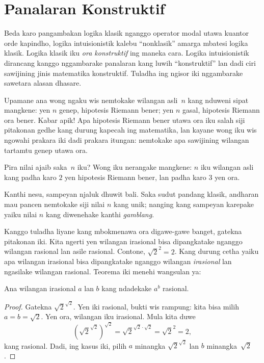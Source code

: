 \documentclass[../../../include/open-logic-chapter]{subfiles}
\begin{document}

\section{Panalaran Konstruktif}

Beda karo pangambakan logika klasik nganggo operator modal utawa
kuantor orde kapindho, logika intuisionistik kalebu ``nonklasik''
amarga mbatesi logika klasik. Logika klasik iku \emph{ora konstruktif}
ing maneka cara. Logika intuisionistik dirancang kanggo nggambarake
panalaran kang luwih ``konstruktif'' lan dadi ciri sawijining jinis
matematika konstruktif. Tuladha ing ngisor iki nggambarake sawetara
alasan dhasare.

Upamane ana wong ngaku wis nemtokake wilangan asli~$n$ kang nduweni
sipat mangkene: yen $n$ genep, hipotesis Riemann bener; yen $n$
gasal, hipotesis Riemann ora bener. Kabar apik!{} Apa hipotesis
Riemann bener utawa ora iku salah siji pitakonan gedhe kang durung
kapecah ing matematika, lan kayane wong iku wis ngowahi prakara iki
dadi prakara itungan: nemtokake apa sawijining wilangan tartamtu
genep utawa ora.

Pira nilai ajaib saka~$n$ iku? Wong iku nerangake mangkene: $n$ iku
wilangan asli kang padha karo $2$ yen hipotesis Riemann bener, lan
padha karo $3$ yen ora.

Kanthi nesu, sampeyan njaluk dhuwit bali. Saka sudut pandang klasik,
andharan mau pancen nemtokake siji nilai $n$ kang unik; nanging kang
sampeyan karepake yaiku nilai $n$ kang diwenehake kanthi
\emph{gamblang}.

Kanggo tuladha liyane kang mbokmenawa ora digawe-gawe banget,
gatekna pitakonan iki. Kita ngerti yen wilangan irasional bisa
dipangkatake nganggo wilangan rasional lan asile rasional. Contone,
$\sqrt{2}^2 = 2$. Kang durung cetha yaiku apa wilangan irasional
bisa dipangkatake nganggo wilangan \emph{irasional} lan ngasilake
wilangan rasional. Teorema iki menehi wangsulan ya:

\begin{thm}
Ana wilangan irasional $a$ lan $b$ kang ndadekake $a^b$ rasional.
\end{thm}

\begin{proof}
Gatekna $\sqrt{2}^{\sqrt{2}}$. Yen iki rasional, bukti wis rampung:
kita bisa milih $a = b = \sqrt{2}$. Yen ora, wilangan iku irasional.
Mula kita duwe
\[
(\sqrt{2}^{\sqrt{2}})^{\sqrt{2}} = \sqrt{2}^{\sqrt{2} \cdot
  \sqrt{2}} = \sqrt{2}^2 = 2,
\]
kang rasional. Dadi, ing kasus iki, pilih $a$ minangka
$\sqrt{2}^{\sqrt{2}}$ lan $b$ minangka~$\sqrt 2$.
\end{proof}
\end{document}
